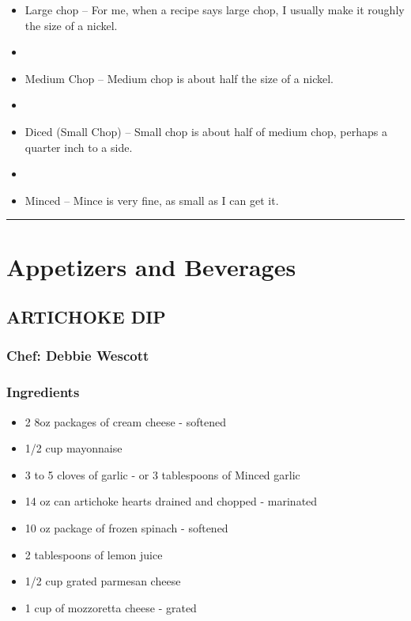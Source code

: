 \documentclass[
]{book}
\providecommand{\tightlist}{%
  \setlength{\itemsep}{0pt}\setlength{\parskip}{0pt}}
\begin{document}
\begin{itemize}
\item
  Large chop -- For me, when a recipe says large chop, I usually make it roughly the size of a nickel.
\item
\item
  Medium Chop -- Medium chop is about half the size of a nickel.
\item
\item
  Diced (Small Chop) -- Small chop is about half of medium chop, perhaps a quarter inch to a side.
\item
\item
  Minced -- Mince is very fine, as small as I can get it.
\end{itemize}

\begin{center}\rule{0.5\linewidth}{0.5pt}\end{center}

\hypertarget{appetizers}{%
\chapter{Appetizers and Beverages}\label{appetizers}}

\hypertarget{artichoke-dip}{%
\section*{ARTICHOKE DIP}\label{artichoke-dip}}


\hypertarget{chef-debbie-wescott}{%
\subsection*{Chef: Debbie Wescott}\label{chef-debbie-wescott}}


\hypertarget{ingredients}{%
\subsection*{Ingredients}\label{ingredients}}


\begin{itemize}
\tightlist
\item
  2 8oz packages of cream cheese - softened
\item
  1/2 cup mayonnaise
\item
  3 to 5 cloves of garlic - or 3 tablespoons of Minced garlic
\item
  14 oz can artichoke hearts drained and chopped - marinated
\item
  10 oz package of frozen spinach - softened
\item
  2 tablespoons of lemon juice
\item
  1/2 cup grated parmesan cheese
\item
  1 cup of mozzoretta cheese - grated
\end{itemize}
\end{document}
